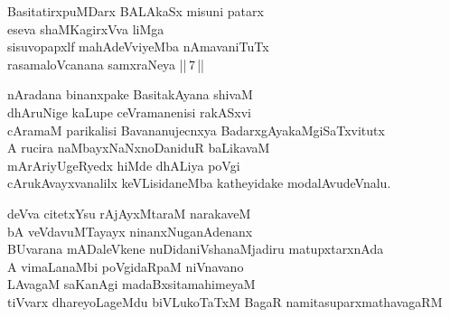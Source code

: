 \begin{entry}
\begin{shl}
BasitatirxpuMDarx BALAkaSx misuni patarx\\
eseva shaMKagirxVva liMga\\
sisuvopapxlf mahAdeVviyeMba nAmavaniTuTx\\
rasamaloVcanana samxraNeya  ||\,7\,||
\end{shl}
\end{entry}

\begin{entry}
\gl{}
\begin{shl}
nAradana binanxpake BasitakAyana shivaM\\
dhAruNige kaLupe ceVramanenisi rakASxvi\\
cAramaM parikalisi Bavananujecnxya BadarxgAyakaMgiSaTxvitutx\\
A rucira naMbayxNaNxnoDaniduR baLikavaM\\
mArAriyUgeRyedx hiMde dhALiya poVgi\\
cArukAvayxvanalilx keVLisidaneMba katheyidake modalAvudeVnalu.
\end{shl}
\end{entry}

\begin{entry}
\gl{}
\begin{shl}
deVva citetxYsu rAjAyxMtaraM narakaveM\\
bA veVdavuMTayayx ninanxNuganAdenanx\\
BUvarana mADaleVkene nuDidaniVshanaMjadiru matupxtarxnAda\\
A vimaLanaMbi poVgidaRpaM niVnavano\\
LAvagaM saKanAgi madaBxsitamahimeyaM\\
tiVvarx dhareyoLageMdu biVLukoTaTxM BagaR namitasuparxmathavagaRM
\end{shl}
\end{entry}

\begin{entry}
\end{entry}

